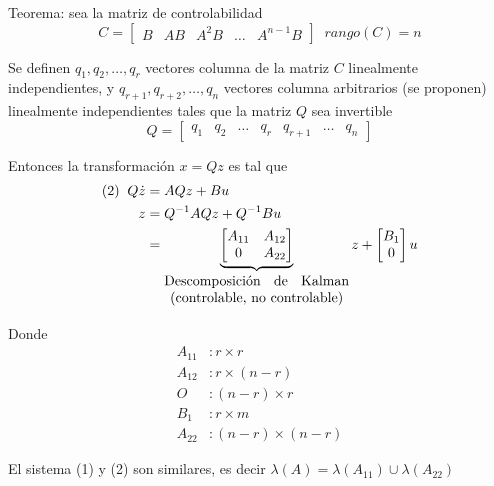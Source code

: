 Teorema: sea la matriz de controlabilidad
\[
    C = \begin{bmatrix}
            B & AB & A^{2}B & \ldots & A^{n-1}B
        \end{bmatrix} \;\; rango(C) = n
\]

Se definen \( q_{1}, q_{2}, \ldots, q_{r} \) vectores columna de la matriz \( C \) linealmente independientes, y \( q_{r+1}, q_{r+2}, \ldots, q_{n} \) vectores columna arbitrarios (se proponen) linealmente independientes tales que la matriz \( Q \) sea invertible
\[
    Q = \begin{bmatrix}
            q_{1} & q_{2} & \ldots & q_{r} & q_{r+1} & \ldots & q_{n} 
        \end{bmatrix}
\]

Entonces la transformación \( x = Qz \) es tal que
\[  
    \begin{split}
        (2) \;\; Q\dot{z} & = AQz + Bu \\
        z & = Q^{-1}AQz + Q^{-1}Bu \\
        & = \underbrace{
                \begin{bmatrix}
                    A_{11} & A_{12} \\
                    0 & A_{22}
                \end{bmatrix}
                        }_
                        {
                \begin{matrix}
                    \text{Descomposición \; de \; Kalman} \\
                     \text{(controlable, no controlable)}
                \end{matrix} 
                        }
            z +
            \begin{bmatrix}
                B_{1} \\ 0
            \end{bmatrix} u
    \end{split}
\]

Donde
\[
    \begin{split}
        A_{11} & : r \times r \\
        A_{12} & : r \times (n-r) \\
        O & : (n-r) \times r \\
        B_{1} & : r \times m \\
        A_{22} & : (n-r) \times (n-r)
    \end{split}
\]

El sistema (1) y (2) son similares, es decir \( \lambda(A) = \lambda(A_{11}) \cup \lambda(A_{22}) \)

